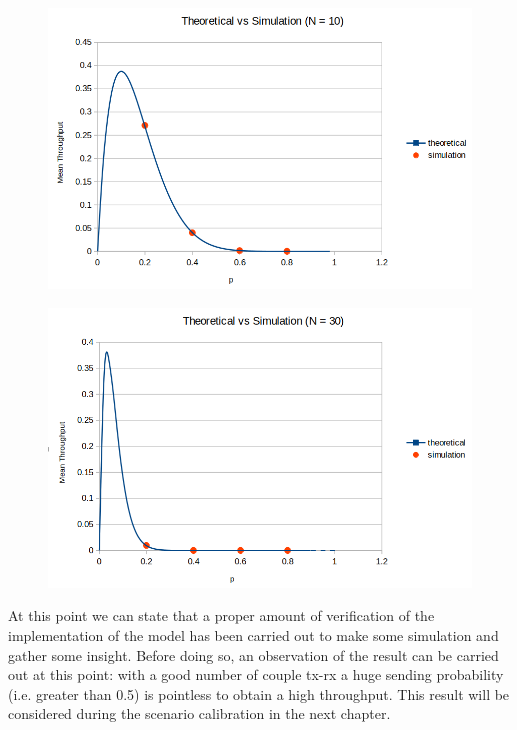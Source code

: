 \begin{figure}[H]
	\centering
	\includegraphics[width=\textwidth]{img/SecondVerificationN10.png}
\end{figure}
\begin{figure}[H]
	\centering
	\includegraphics[width=\textwidth]{img/SecondVerificationN30.png}
\end{figure}

At this point we can state that a proper amount of verification of the implementation of the model has been carried out to make some simulation and gather some insight. Before doing so, an observation of the result can be carried out at this point: with a good number of couple tx-rx a huge sending probability (i.e. greater than 0.5) is pointless to obtain a high throughput. This result will be considered during the scenario calibration in the next chapter. 